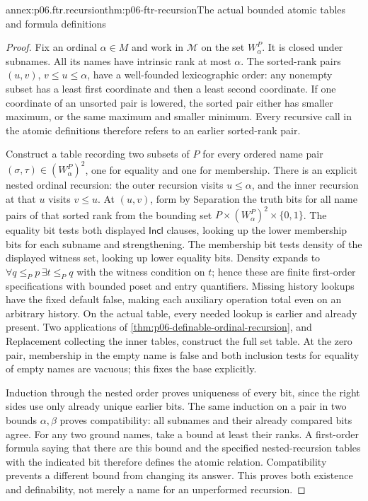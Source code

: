 \begin{annexitem}{annex:p06.ftr.recursion}{thm:p06-ftr-recursion}{The actual bounded atomic tables and formula definitions}
\begin{proof}
Fix an ordinal \(\alpha\in M\) and work in \(\mathcal M\) on the
set \(W_\alpha^P\). It is closed under subnames. All its names have
intrinsic rank at most \(\alpha\). The sorted-rank pairs
\((u,v)\), \(v\leq u\leq\alpha\), have a well-founded lexicographic
order: any nonempty subset has a least first coordinate and then a least
second coordinate. If one coordinate of an unsorted pair is lowered,
the sorted pair either has smaller maximum, or the same maximum and
smaller minimum. Every recursive call in the atomic definitions therefore
refers to an earlier sorted-rank pair.

Construct a table recording two subsets of \(P\) for every ordered
name pair \((\sigma,\tau)\in(W_\alpha^P)^2\), one for equality and
one for membership. There is an explicit nested ordinal recursion:
the outer recursion visits \(u\leq\alpha\), and the inner recursion
at that \(u\) visits \(v\leq u\). At \((u,v)\), form by Separation
the truth bits for all name pairs of that sorted rank from the bounding
set \(P\times(W_\alpha^P)^2\times\{0,1\}\).
The equality bit tests both displayed \(\mathsf{Incl}\) clauses, looking
up the lower membership bits for each subname and strengthening.
The membership bit tests density of the displayed witness set, looking
up lower equality bits. Density expands to
\(\forall q\leq_P p\,\exists t\leq_P q\) with the witness condition
on \(t\); hence these are finite first-order specifications with
bounded poset and entry quantifiers. Missing history lookups have the
fixed default false, making each auxiliary operation total even on an
arbitrary history. On the actual table, every needed lookup is earlier
and already present. Two applications of
\cref{thm:p06-definable-ordinal-recursion}, and Replacement collecting
the inner tables, construct the full set table. At the zero pair,
membership in the empty name is false and both inclusion tests for
equality of empty names are vacuous; this fixes the base explicitly.

Induction through the nested order proves uniqueness of every bit, since
the right sides use only already unique earlier bits. The same induction
on a pair in two bounds \(\alpha,\beta\) proves compatibility: all
subnames and their already compared bits agree. For any two ground names,
take a bound at least their ranks. A first-order formula saying that there
are this bound and the specified nested-recursion tables with the indicated
bit therefore defines the atomic relation. Compatibility prevents a
different bound from changing its answer. This proves both existence and
definability, not merely a name for an unperformed recursion.


\end{proof}
\end{annexitem}
